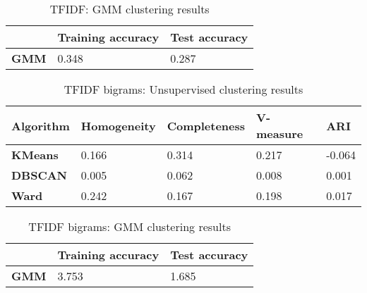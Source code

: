 \documentclass{article}
\begin{document}
\begin{table}[h]
\begin{tabular}{l|ll}
             & \textbf{Training accuracy} & \textbf{Test accuracy} \\ \hline
\textbf{GMM} & 0.348                      & 0.287                 
\end{tabular}
\caption{TFIDF: GMM clustering results}
\end{table}

\begin{table}[h]
\begin{tabular}{l|llll}
\textbf{Algorithm} & \textbf{Homogeneity} & \textbf{Completeness} & \textbf{V-measure} & \textbf{ARI} \\ \hline
\textbf{KMeans}    & 0.166                & 0.314                 & 0.217              & -0.064       \\
\textbf{DBSCAN}    & 0.005                & 0.062                 & 0.008              & 0.001        \\
\textbf{Ward}      & 0.242                & 0.167                 & 0.198              & 0.017       
\end{tabular}
\caption{TFIDF bigrams: Unsupervised clustering results}
\end{table}

\begin{table}[h]
\begin{tabular}{l|ll}
             & \textbf{Training accuracy} & \textbf{Test accuracy} \\ \hline
\textbf{GMM} & 3.753                      & 1.685                 
\end{tabular}
\caption{TFIDF bigrams: GMM clustering results}
\end{table}

\clearpage
\end{document}
